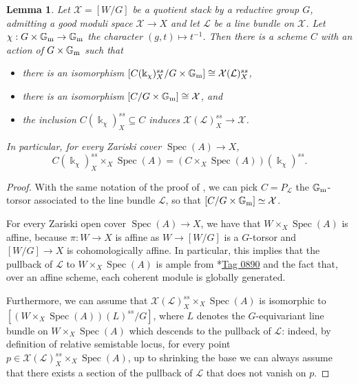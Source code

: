 \documentclass{amsart}
\newcommand{\bG}{\mathbb{G}}
\newcommand{\cL}{\mathcal{L}}
\newcommand{\cX}{\mathcal{X}}
\newcommand{\spec}{\operatorname{Spec}}
\newcommand{\Gm}{\bG_{{\rm m}}}
\newtheorem{Lemma}[theorem]{Lemma}
\theoremstyle{definition}
\theoremstyle{definition}
\begin{document}
{\begin{Lemma}\label{lemma_cone_construction_over_X}
    Let $\cX=[W/G]$ be a quotient stack by a reductive group $G$, admitting a good moduli space $\cX\to X$ and let $\cL$ be a line bundle on $\cX$. Let $\chi:G\times \Gm\to \Gm$ the character $(g,t)\mapsto t^{-1}$.
    Then there is a scheme $C$ with an action of $G\times \Gm$ such that
\begin{itemize}
    \item there is an isomorphism $[C(\Bbbk_\chi)^{ss}_X/G\times \Gm]\cong \cX(\cL)^{ss}_X$, 
    \item  there is an isomorphism $[C/G\times \Gm]\cong \cX$, and 
    \item the inclusion $C(\Bbbk_\chi)^{ss}_X\subseteq C$ induces $\cX(\cL)^{ss}_X\to \cX$.
\end{itemize}
    In particular, for every Zariski cover $\spec(A)\to X$, 
        \[C(\Bbbk_\chi)^{ss}_X\times_X\spec(A)=(C\times_X\spec(A))(\Bbbk_\chi)^{ss}.\]
\end{Lemma}
\begin{proof}

    With the same notation of the proof of , we can pick $C=P_\cL$ the $\Gm$-torsor associated to the line bundle $\cL$, so that $[C/G\times\Gm]\simeq\cX$. 

    For every Zariski open cover $\spec(A) \to X$, we have that $W\times_X \spec(A)$ is affine, because $\pi:W\to X$ is affine as $W\to [W/G]$ is a $G$-torsor and $[W/G]\to X$ is cohomologically affine. In particular, this implies that the pullback of $\cL$ to $W\times_X\spec(A)$ is ample from \cite{stacks-project}*{\href{https://stacks.math.columbia.edu/tag/0890}{Tag 0890}} and the fact that, over an affine scheme, each coherent module is globally generated. 

    Furthermore, we can assume that $\cX(\cL)^{ss}_{X}\times_X \spec(A)$ is isomorphic to $[(W\times_X \spec(A))(L)^{ss} /G]$, where $L$ denotes the $G$-equivariant line bundle on $W\times_X \spec(A)$ which descends to the pullback of $\cL$: indeed, by definition of relative semistable locus, for every point $p\in \cX(\cL)^{ss}_{X}\times_X \spec(A)$, up to shrinking the base we can always assume that there exists a section of the pullback of $\cL$ that does not vanish on $p$.
    

\end{proof}}
\end{document}
